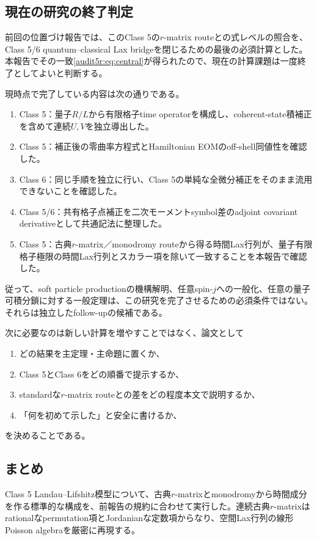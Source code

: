 \subsection{現在の研究の終了判定}

前回の位置づけ報告では、このClass 5の$r$-matrix routeとの式レベルの照合を、Class 5/6 quantum--classical Lax bridgeを閉じるための最後の必須計算とした。本報告でその一致\eqref{audit5r:eq:central}が得られたので、現在の計算課題は一度終了としてよいと判断する。

現時点で完了している内容は次の通りである。
\begin{enumerate}
\item Class 5：量子$R/L$から有限格子time operatorを構成し、coherent-state積補正を含めて連続$U,V$を独立導出した。
\item Class 5：補正後の零曲率方程式とHamiltonian EOMのoff-shell同値性を確認した。
\item Class 6：同じ手順を独立に行い、Class 5の単純な全微分補正をそのまま流用できないことを確認した。
\item Class 5/6：共有格子点補正を二次モーメントsymbol差のadjoint covariant derivativeとして共通記法に整理した。
\item Class 5：古典$r$-matrix／monodromy routeから得る時間Lax行列が、量子有限格子極限の時間Lax行列とスカラー項を除いて一致することを本報告で確認した。
\end{enumerate}

従って、soft particle productionの機構解明、任意spin-$j$への一般化、任意の量子可積分鎖に対する一般定理は、この研究を完了させるための必須条件ではない。それらは独立したfollow-upの候補である。

次に必要なのは新しい計算を増やすことではなく、論文として
\begin{enumerate}
\item どの結果を主定理・主命題に置くか、
\item Class 5とClass 6をどの順番で提示するか、
\item standardな$r$-matrix routeとの差をどの程度本文で説明するか、
\item 「何を初めて示した」と安全に書けるか、
\end{enumerate}
を決めることである。

\subsection{まとめ}

Class 5 Landau--Lifshitz模型について、古典$r$-matrixとmonodromyから時間成分を作る標準的な構成を、前報告の規約に合わせて実行した。連続古典$r$-matrixはrationalなpermutation項とJordanianな定数項からなり、空間Lax行列の線形Poisson algebraを厳密に再現する。

